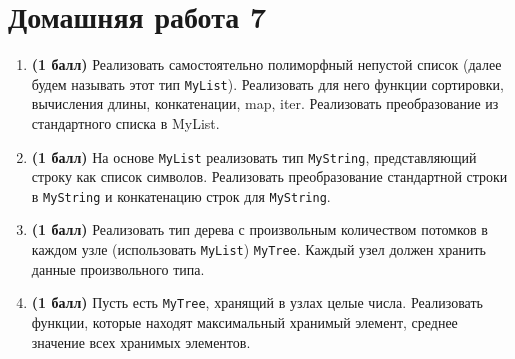 \section{Домашняя работа 7 }


\begin{enumerate}
    \item \textbf{(1 балл)} Реализовать самостоятельно полиморфный непустой список (далее будем называть этот тип \texttt{MyList}). Реализовать для него функции сортировки, вычисления длины, конкатенации, map, iter. Реализовать преобразование из стандартного списка в MyList.
    \item \textbf{(1 балл)} На основе \texttt{MyList} реализовать тип \texttt{MyString}, представляющий строку как список символов. Реализовать преобразование стандартной строки в \texttt{MyString} и конкатенацию строк для  \texttt{MyString}.
    \item \textbf{(1 балл)} Реализовать тип дерева с произвольным количеством потомков в каждом узле (использовать \texttt{MyList}) \texttt{MyTree}. Каждый узел должен хранить данные произвольного типа.

    \item \textbf{(1 балл)} Пусть есть \texttt{MyTree}, хранящий в узлах целые числа. Реализовать функции, которые находят максимальный хранимый элемент, среднее значение всех хранимых элементов.
\end{enumerate}